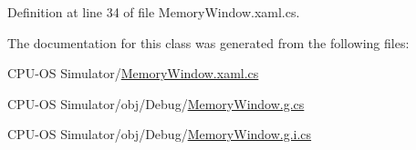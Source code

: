 Definition at line 34 of file Memory\+Window.\+xaml.\+cs.



The documentation for this class was generated from the following files\+:\begin{DoxyCompactItemize}
\item 
C\+P\+U-\/\+O\+S Simulator/\hyperlink{_memory_window_8xaml_8cs}{Memory\+Window.\+xaml.\+cs}\item 
C\+P\+U-\/\+O\+S Simulator/obj/\+Debug/\hyperlink{_debug_2_memory_window_8g_8cs}{Memory\+Window.\+g.\+cs}\item 
C\+P\+U-\/\+O\+S Simulator/obj/\+Debug/\hyperlink{_debug_2_memory_window_8g_8i_8cs}{Memory\+Window.\+g.\+i.\+cs}\end{DoxyCompactItemize}
